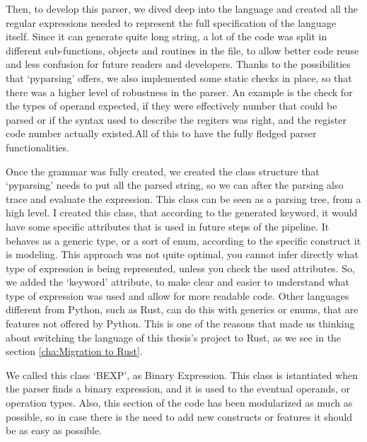 Then, to develop this parser, we dived deep into the language and created all
the regular expressions needed to represent the full specification of the
language itself. Since it can generate quite long string, a lot of the code was
split in different sub-functions, objects and routines in the file, to allow
better code reuse and less confusion for future readers and developers. Thanks to
the possibilities that `pyparsing' offers, we also implemented some static
checks in place, so that there was a higher level of robustness in the parser.
An example is the check for the types of operand expected, if they were effectively
number that could be parsed or if the syntax used to describe the regiters was right,
and the register code number actually existed.All of this to have the fully
fledged parser functionalities.

Once the grammar was fully created, we created the class structure that `pyparsing'
needs to put all the parsed string, so we can after the parsing also trace and
evaluate the expression. This class can be seen as a parsing tree, from a high
level. I created this class, that according to the generated keyword, it would have
some specific attributes that is used in future steps of the pipeline. It
behaves as a generic type, or a sort of enum, according to the specific
construct it is modeling. This approach was not quite optimal, you cannot infer
directly what type of expression is being represented, unless you check the used
attributes. So, we added the `keyword' attribute, to make clear and easier to
understand what type of expression was used and allow for more readable code. Other
languages different from Python, such as Rust, can do this with generics or enums,
that are features not offered by Python. This is one of the reasons that made us
thinking about switching the language of this thesis's project to Rust, as we
see in the section \ref{cha:Migration to Rust}.

We called this class `BEXP', as Binary Expression. This class is istantiated
when the parser finds a binary expression, and it is used to the eventual operands,
or operation types. Also, this section of the code has been modularized as much
as possible, so in case there is the need to add new constructs or features it should
be as easy as possible.

